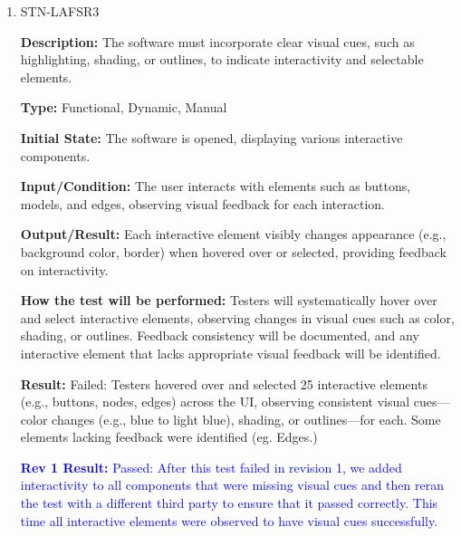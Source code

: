 \documentclass[12pt, titlepage]{article}
\begin{document}
\begin{enumerate}
\textbf{Output/Result:} The interface displays a neutral base color palette with no more than three accent colors used only for actionable elements, alerts, or key information.

\textbf{How the test will be performed:} Testers will verify that the color scheme adheres to the neutral base and professional accent guidelines. Screenshots will be reviewed to confirm that accent colors are used consistently and only in areas requiring emphasis, and no more than three accent colors are visible at any time.

\textbf{Result:} Passed: Testers verified adherence to the neutral base and professional accent guidelines across ten screenshots from key UI sections (e.g., canvas, toolbar). Only three accent colors (blue, yellow, red) were consistently used for emphasis (e.g., buttons, alerts), with no deviations noted.

\item{STN-LAFSR3\\}

\textbf{Description:} The software must incorporate clear visual cues, such as highlighting, shading, or outlines, to indicate interactivity and selectable elements.

\textbf{Type:} Functional, Dynamic, Manual

\textbf{Initial State:} The software is opened, displaying various interactive components.

\textbf{Input/Condition:} The user interacts with elements such as buttons, models, and edges, observing visual feedback for each interaction.

\textbf{Output/Result:} Each interactive element visibly changes appearance (e.g., background color, border) when hovered over or selected, providing feedback on interactivity.

\textbf{How the test will be performed:} Testers will systematically hover over and select interactive elements, observing changes in visual cues such as color, shading, or outlines. Feedback consistency will be documented, and any interactive element that lacks appropriate visual feedback will be identified.

\textbf{Result:} Failed: Testers hovered over and selected 25 interactive elements (e.g., buttons, nodes, edges) across the UI, observing consistent visual cues—color changes (e.g., blue to light blue), shading, or outlines—for each. Some elements lacking feedback were identified (eg. Edges.) 

\textcolor{blue}{\textbf{Rev 1 Result:} Passed: After this test failed in revision 1, we added interactivity to all components that were missing visual cues and then reran the test with a different third party to ensure that it passed correctly. This time all interactive elements were observed to have visual cues successfully.}

\end{enumerate}
\end{document}
